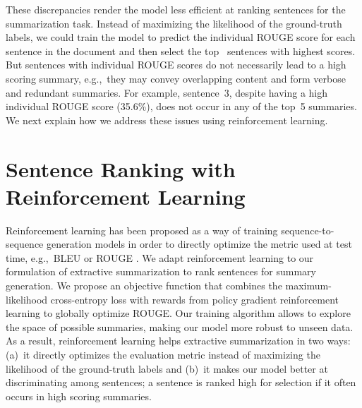 \documentclass[11pt,a4paper]{article}
\begin{document}
These discrepancies render the model less efficient at ranking
sentences for the summarization task. Instead of maximizing the
likelihood of the ground-truth labels, we could train the model to
predict the individual ROUGE score for each sentence in the document
and then select the top ~sentences with highest scores. But
sentences with individual ROUGE scores do not necessarily lead to a
high scoring summary, e.g.,~they may convey overlapping content and
form verbose and redundant summaries. For example, sentence~3, despite
having a high individual ROUGE score (35.6\%), does not occur in any
of the top~5 summaries. We next explain how we address these issues
using reinforcement learning.



































\section{Sentence Ranking with Reinforcement Learning} 
\label{sec:reinforced}

Reinforcement learning \cite{Sutton98a} has been proposed as a way of
training sequence-to-sequence generation models in order to directly
optimize the metric used at test time, e.g.,~BLEU or ROUGE
\cite{ranzato-arxiv15-bias}. We adapt reinforcement learning to our
formulation of extractive summarization to rank sentences for summary
generation.
We propose an objective function that combines the maximum-likelihood
cross-entropy loss with rewards from policy gradient reinforcement
learning to globally optimize ROUGE. Our training algorithm allows to
explore the space of possible summaries, making our model more robust
to unseen data. As a result, reinforcement learning helps extractive
summarization in two ways: (a)~it directly optimizes the evaluation
metric instead of maximizing the likelihood of the ground-truth labels
and (b)~it makes our model better at discriminating among sentences; a
sentence is ranked high for selection if it often occurs in high
scoring summaries.
\end{document}
